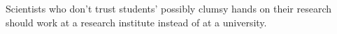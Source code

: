 \documentclass[10pt]{stellingen}
\begin{document}

\begin{stelling}
Scientists who don't trust students' possibly clumsy hands on their research should work at a research institute instead of at a university.
\end{stelling}

\end{document}
